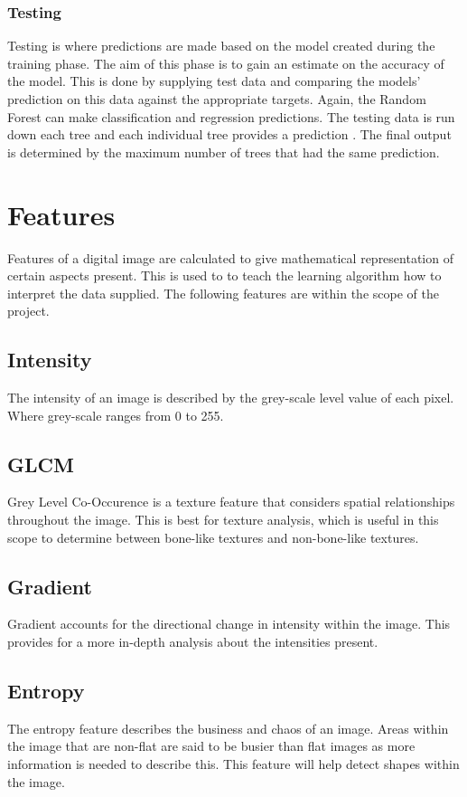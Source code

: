 \subsubsection{Testing}
Testing is where predictions are made based on the model created during the training phase. The aim of this phase is to gain an estimate on the accuracy of the model. This is done by supplying test data and comparing the models' prediction on this data against the appropriate targets. Again, the Random Forest can make classification and regression predictions. The testing data is run down each tree and each individual tree provides a prediction \cite{ref:rf_1}. The final output is determined by the maximum number of trees that had the same prediction. 
 
\section{Features}
Features of a digital image are calculated to give mathematical representation of certain aspects present. This is used to to teach the learning algorithm how to interpret the data supplied. The following features are within the scope of the project. 
\subsection{Intensity}
The intensity of an image is described by the grey-scale level value of each pixel. Where grey-scale ranges from 0 to 255. 
\subsection{GLCM}
Grey Level Co-Occurence is a texture feature that considers spatial relationships throughout the image. This is best for texture analysis, which is useful in this scope to determine between bone-like textures and non-bone-like textures. \cite{ref:glcm_1}
\subsection{Gradient}
Gradient accounts for the directional change in intensity within the image. This provides for a more in-depth analysis about the intensities present. \cite{ref:gradient_1} 
\subsection{Entropy}
The entropy feature describes the business and chaos of an image. Areas within the image that are non-flat are said to be busier than flat images as more information is needed to describe this. This feature will help detect shapes within the image. \cite{ref:ent_1}

